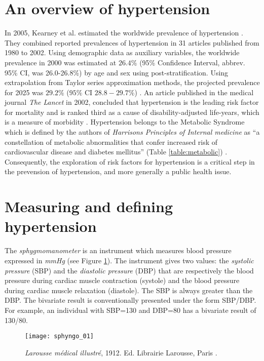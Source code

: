 \section{An overview of hypertension}
In 2005, Kearney et al. estimated the worldwide prevalence of hypertension \cite{kearney_global_2005}. They combined reported prevalences of hypertension in 31 articles published from 1980 to 2002. Using demographic data as auxiliary variables, the worldwide prevalence in 2000 was estimated at $26.4\%$ (95\% Confidence Interval, abbrev. 95\% CI, was 26.0-26.8\%) by age and sex using post-stratification. Using extrapolation from Taylor series approximation methods, the projected prevalence for 2025 was $29.2\%$ ($95\% \text{ CI } 28.8-29.7\%$) \cite{kearney_global_2005}. An article published in the medical journal \emph{The Lancet} in 2002, concluded that hypertension is the leading risk factor for mortality and is ranked third as a cause of disability-adjusted life-years, which is a measure of morbidity \cite{ezzati_selected_2002}. Hypertension belongs to the Metabolic Syndrome which is defined by the authors of \emph{Harrisons Principles of Internal medicine} as ``a constellation of metabolic abnormalities that confer increased risk of cardiovascular disease and diabetes mellitus'' (Table \ref{table:metabolic}) \cite{kasper_harrisons_2015}. Consequently, the exploration of risk factors for hypertension is a critical step in the prevension of hypertension, and more generally a public health issue.

\section{Measuring and defining hypertension}
The \emph{sphygmomanometer} is an instrument which measures blood pressure expressed in \emph{mmHg} (see Figure \ref{fig:sphyngo}). The instrument gives two values: the \emph{systolic pressure} (SBP) and the \emph{diastolic pressure} (DBP) that are respectively the blood pressure during cardiac muscle contraction (systole) and the blood pressure during cardiac muscle relaxation (diastole). The SBP is always greater than the DBP. The bivariate result is conventionally presented under the form SBP/DBP. For example, an individual with SBP=130 and DBP=80 has a bivariate result of 130/80.

\begin{figure}
\centering
\centering
\captionsetup{singlelinecheck = false, format= hang, justification=raggedright, font=small, labelsep=space}
\texttt{[image: sphyngo\_01]}
  \label{fig:sphyngo}
\begin{flushleft}
{\footnotesize \emph{Larousse médical illustré}, 1912. Ed. Librairie Larousse, Paris \cite{galtier-boissiere_larousse_1912}.}
\end{flushleft}
\end{figure}

